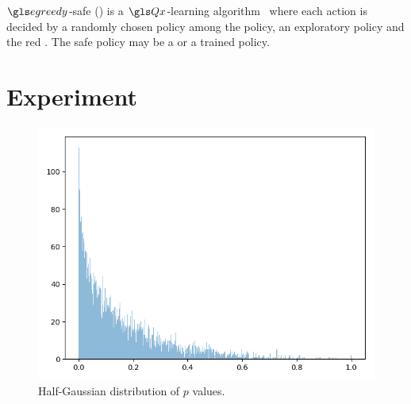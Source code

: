 $\egreedy$-safe () is a $\Q$-learning algorithm~\parencite{Watkins92q-learning} where each action is decided by a randomly chosen policy among the  policy, an exploratory policy and the red . The safe policy may be a  or a trained policy.

\section{Experiment}

\begin{figure}
        \centering

    \includegraphics[scale=0.35]{sources/contribution/slsp/distribusers}
    \caption{Half-Gaussian distribution of $p$ values.}
    \label{distribusers}
\end{figure}


